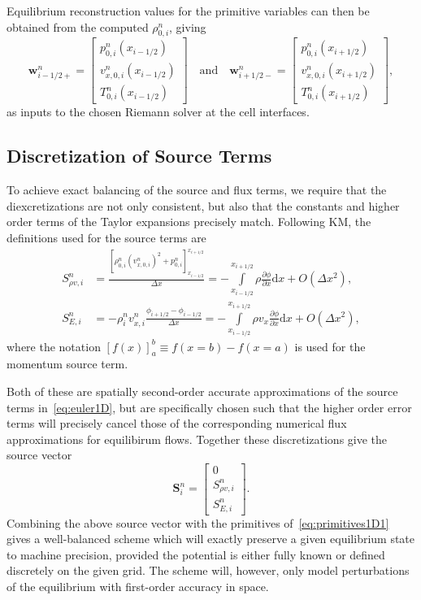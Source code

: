 Equilibrium reconstruction values for the primitive variables can then be obtained from the computed $\rho_{0,i}^n$, giving
\begin{equation} \label{eq:primitives1D1}
\mathbf{w}_{i-1/2+}^n=
\begin{bmatrix}
p_{0,i}^n(x_{i-1/2}) \\ v_{x,0,i}^n(x_{i-1/2}) \\ T_{0,i}^n(x_{i-1/2})
\end{bmatrix}
\quad \textrm{and} \quad \mathbf{w}_{i+1/2-}^n=
\begin{bmatrix}
p_{0,i}^n(x_{i+1/2}) \\ v_{x,0,i}^n(x_{i+1/2}) \\ T_{0,i}^n(x_{i+1/2})
\end{bmatrix},
\end{equation}
as inputs to the chosen Riemann solver at the cell interfaces.

\subsection{Discretization of Source Terms}
\label{subsec:sources}

To achieve exact balancing of the source and flux terms, we require that the diexcretizations are not only consistent, but also that the constants and higher order terms of the Taylor expansions precisely match. Following KM, the definitions used for the source terms are
\begin{align}
S_{\rho v,i}^n&=\frac{\left[\rho_{0,i}^n\left(v_{x,0,i}^n\right)^2+p_{0,i}^n\right]_{x_{i-1/2}}^{x_{i+1/2}}}{\Delta x}=-\int\limits_{x_{i-1/2}}^{x_{i+1/2}}\rho \frac{\partial \phi}{\partial x}\textrm{d}x+O\left(\Delta x^2\right), \label{eq:momentumSource} \\
S_{E,i}^n&=-\rho_i^n v_{x,i}^n\frac{\phi_{i+1/2}-\phi_{i-1/2}}{\Delta x}=-\int\limits_{x_{i-1/2}}^{x_{i+1/2}}\rho v_x \frac{\partial \phi}{\partial x}\textrm{d}x+O\left(\Delta x^2\right), \label{eq:energySource}
\end{align}
where the notation $\left[f(x)\right]_a^b\equiv f(x=b)-f(x=a)$ is used for the momentum source term.

Both of these are spatially second-order accurate approximations of the source terms in~\eqref{eq:euler1D}, but are specifically chosen such that the higher order error terms will precisely cancel those of the corresponding numerical flux approximations for equilibirum flows. Together these discretizations give the source vector
\begin{equation} \label{eq:sourceVector}
\mathbf{S}_i^n=
\begin{bmatrix}
0 \\ S_{\rho v,i}^n \\ S_{E,i}^n
\end{bmatrix}.
\end{equation}
Combining the above source vector with the primitives of~\eqref{eq:primitives1D1} gives a well-balanced scheme which will exactly preserve a given equilibrium state to machine precision, provided the potential is either fully known or defined discretely on the given grid. The scheme will, however, only model perturbations of the equilibrium with first-order accuracy in space.

